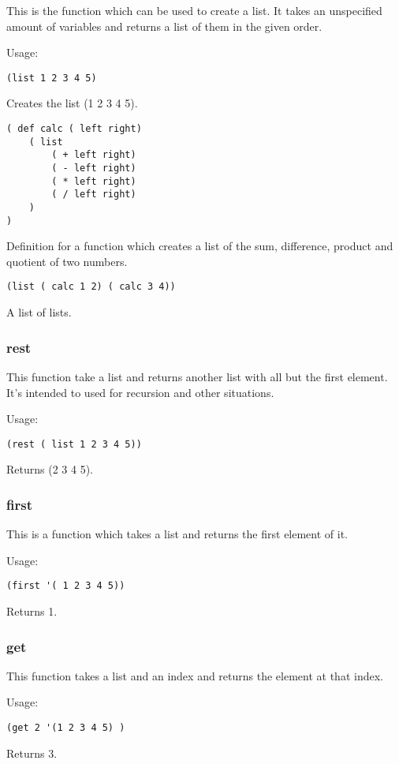 This is the function which can be used to create a list. 
It takes an unspecified amount of variables and returns a list of them in the given order. 

Usage:
\begin{lstlisting}
(list 1 2 3 4 5)
\end{lstlisting}
Creates the list (1 2 3 4 5).
\begin{lstlisting}
( def calc ( left right) 
	( list
		( + left right)
		( - left right)
		( * left right)
		( / left right)
	)
)
\end{lstlisting}
Definition for a function which creates a list of the sum, difference, product and quotient of two numbers.
\begin{lstlisting}
(list ( calc 1 2) ( calc 3 4))
\end{lstlisting}
A list of lists.

\subsubsection{rest}

This function take a list and returns another list with all but the first element. 
It's intended to used for recursion and other situations. 

Usage:
\begin{lstlisting}
(rest ( list 1 2 3 4 5))
\end{lstlisting}
Returns (2 3 4 5).

\subsubsection{first}

This is a function which takes a list and returns the first element of it.

Usage:
\begin{lstlisting}
(first '( 1 2 3 4 5))
\end{lstlisting}
Returns 1.

\subsubsection{get}

This function takes a list and an index and returns the element at that index.

Usage:
\begin{lstlisting}
(get 2 '(1 2 3 4 5) )
\end{lstlisting}
Returns 3.


